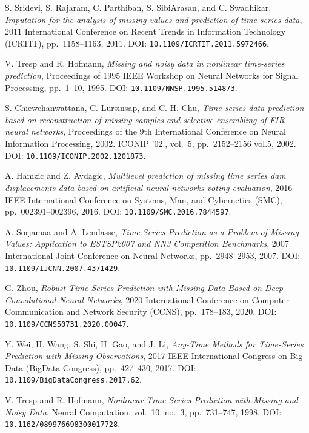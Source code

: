 \begin{enumerate}[label={[S\arabic*]}]
    \item %
    S. Sridevi, S. Rajaram, C. Parthiban, S. SibiArasan, and C. Swadhikar, \textit{Imputation for the analysis of missing values and prediction of time series data}, 2011 International Conference on Recent Trends in Information Technology (ICRTIT), pp.~1158–1163, 2011. DOI: \texttt{10.1109/ICRTIT.2011.5972466}.
    \item %
    V. Tresp and R. Hofmann, \textit{Missing and noisy data in nonlinear time-series prediction}, Proceedings of 1995 IEEE Workshop on Neural Networks for Signal Processing, pp.~1–10, 1995. DOI: \texttt{10.1109/NNSP.1995.514873}.
    \item %
    S. Chiewchanwattana, C. Lursinsap, and C. H. Chu, \textit{Time-series data prediction based on reconstruction of missing samples and selective ensembling of FIR neural networks}, Proceedings of the 9th International Conference on Neural Information Processing, 2002. ICONIP '02., vol.~5, pp.~2152–2156 vol.5, 2002. DOI: \texttt{10.1109/ICONIP.2002.1201873}.
    \item %
    A. Hamzic and Z. Avdagic, \textit{Multilevel prediction of missing time series dam displacements data based on artificial neural networks voting evaluation}, 2016 IEEE International Conference on Systems, Man, and Cybernetics (SMC), pp.~002391–002396, 2016. DOI: \texttt{10.1109/SMC.2016.7844597}.
    \item %
    A. Sorjamaa and A. Lendasse, \textit{Time Series Prediction as a Problem of Missing Values: Application to ESTSP2007 and NN3 Competition Benchmarks}, 2007 International Joint Conference on Neural Networks, pp.~2948–2953, 2007. DOI: \texttt{10.1109/IJCNN.2007.4371429}.
    \item %
    G. Zhou, \textit{Robust Time Series Prediction with Missing Data Based on Deep Convolutional Neural Networks}, 2020 International Conference on Computer Communication and Network Security (CCNS), pp.~178–183, 2020. DOI: \texttt{10.1109/CCNS50731.2020.00047}.
    \item %
    Y. Wei, H. Wang, S. Shi, H. Gao, and J. Li, \textit{Any-Time Methods for Time-Series Prediction with Missing Observations}, 2017 IEEE International Congress on Big Data (BigData Congress), pp.~427–430, 2017. DOI: \texttt{10.1109/BigDataCongress.2017.62}.
    \item %
    V. Tresp and R. Hofmann, \textit{Nonlinear Time-Series Prediction with Missing and Noisy Data}, Neural Computation, vol.~10, no.~3, pp.~731–747, 1998. DOI: \texttt{10.1162/089976698300017728}.

\end{enumerate}
